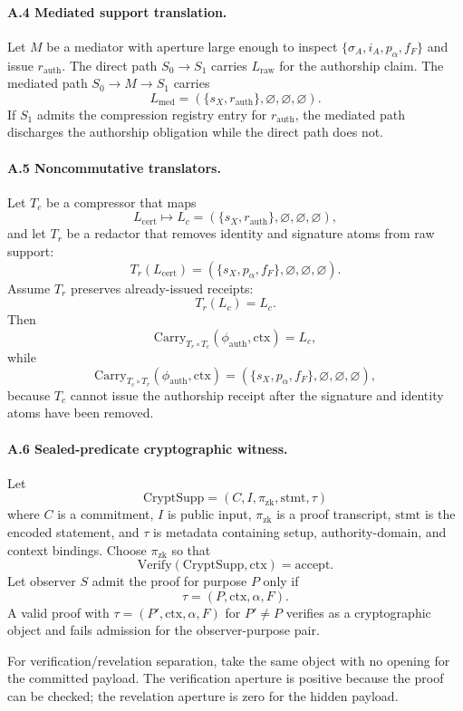\documentclass[11pt,twoside]{article}
\theoremstyle{definition}
\newcommand{\Carry}{\mathrm{Carry}}
\newcommand{\CryptSupp}{\mathrm{CryptSupp}}
\newcommand{\Verify}{\mathrm{Verify}}
\newcommand{\ctx}{\mathrm{ctx}}
\begin{document}
\paragraph{A.4 Mediated support translation.}
Let $M$ be a mediator with aperture large enough to inspect
$\{\sigma_A,i_A,p_\alpha,f_F\}$ and issue $r_{\mathrm{auth}}$. The direct path
$S_0\to S_1$ carries $L_{\mathrm{raw}}$ for the authorship claim. The mediated path
$S_0\to M\to S_1$ carries
\[
  L_{\mathrm{med}}=(\{s_X,r_{\mathrm{auth}}\},\varnothing,\varnothing,\varnothing).
\]
If $S_1$ admits the compression registry entry for $r_{\mathrm{auth}}$, the
mediated path discharges the authorship obligation while the direct path does
not.

\paragraph{A.5 Noncommutative translators.}
Let $T_c$ be a compressor that maps
\[
  L_{\mathrm{cert}}
  \mapsto
  L_c=(\{s_X,r_{\mathrm{auth}}\},\varnothing,\varnothing,\varnothing),
\]
and let $T_r$ be a redactor that removes identity and signature atoms from raw
support:
\[
  T_r(L_{\mathrm{cert}})=(\{s_X,p_\alpha,f_F\},\varnothing,\varnothing,\varnothing).
\]
Assume $T_r$ preserves already-issued receipts:
\[
  T_r(L_c)=L_c.
\]
Then
\[
  \Carry_{T_r\circ T_c}(\phi_{\mathrm{auth}},\ctx)
  =
  L_c,
\]
while
\[
  \Carry_{T_c\circ T_r}(\phi_{\mathrm{auth}},\ctx)
  =
  (\{s_X,p_\alpha,f_F\},\varnothing,\varnothing,\varnothing),
\]
because $T_c$ cannot issue the authorship receipt after the signature and
identity atoms have been removed.

\paragraph{A.6 Sealed-predicate cryptographic witness.}
Let
\[
  \CryptSupp=(C,I,\pi_{\mathrm{zk}},\mathrm{stmt},\tau)
\]
where $C$ is a commitment, $I$ is public input, $\pi_{\mathrm{zk}}$ is a proof
transcript, $\mathrm{stmt}$ is the encoded statement, and $\tau$ is metadata
containing setup, authority-domain, and context bindings. Choose
$\pi_{\mathrm{zk}}$ so that
\[
  \Verify(\CryptSupp,\ctx)=\mathrm{accept}.
\]
Let observer $S$ admit the proof for purpose $P$ only if
\[
  \tau=(P,\ctx,\alpha,F).
\]
A valid proof with $\tau=(P',\ctx,\alpha,F)$ for $P'\neq P$ verifies as a
cryptographic object and fails admission for the observer-purpose pair.

For verification/revelation separation, take the same object with no opening
for the committed payload. The verification aperture is positive because the
proof can be checked; the revelation aperture is zero for the hidden payload.
\end{document}
